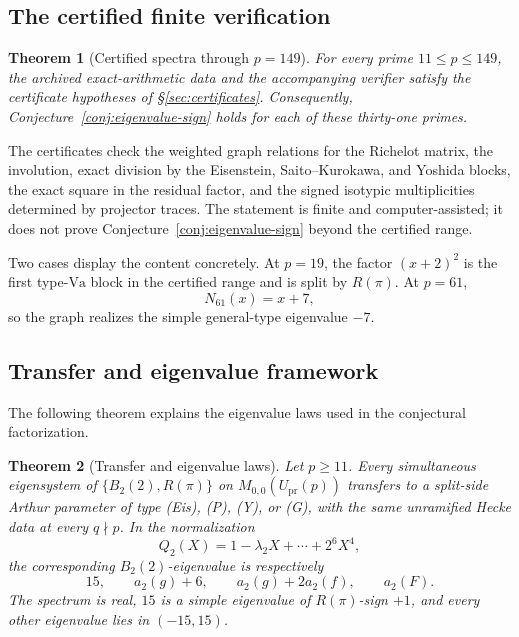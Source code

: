 \documentclass[10pt,a4paper]{amsart}
\newtheorem{theorem}{Theorem}[section]
\newcommand{\Upr}{U_{\mathrm{pr}}}
\newcommand{\Va}{\mathrm{Va}}
\providecommand{\Upr}{U_{\mathrm{pr}}}
\providecommand{\Va}{\mathrm{Va}}
\begin{document}
	\subsection{The certified finite verification}
	
	\begin{theorem}[Certified spectra through $p=149$]
		\label{thm:certified-spectra}
		For every prime $11\le p\le149$, the archived exact-arithmetic data and the
		accompanying verifier satisfy the certificate hypotheses of \S\ref{sec:certificates}.
		Consequently, Conjecture~\ref{conj:eigenvalue-sign} holds for each of these thirty-one
		primes.
	\end{theorem}
	
	The certificates check the weighted graph relations for the Richelot
	matrix, the involution, exact division by the Eisenstein,
	Saito--Kurokawa, and Yoshida blocks, the exact square in the residual
	factor, and the signed isotypic multiplicities determined by projector
	traces. The statement is finite and computer-assisted; it does not prove
	Conjecture~\ref{conj:eigenvalue-sign} beyond the certified range.
	
	Two cases display the content concretely. At $p=19$, the factor
	$(x+2)^2$ is the first type-$\Va$ block in the certified range and is
	split by $R(\pi)$. At $p=61$,
	\[
	N_{61}(x)=x+7,
	\]
	so the graph realizes the simple general-type eigenvalue $-7$.
	
	\subsection{Transfer and eigenvalue framework}
	
	The following theorem explains the eigenvalue laws used in the
	conjectural factorization.
	
	\begin{theorem}[Transfer and eigenvalue laws]\label{thm:transfer-framework}
		Let $p\ge11$. Every simultaneous eigensystem of $\{B_2(2),R(\pi)\}$ on
		$M_{0,0}(\Upr(p))$ transfers to a split-side Arthur parameter of type
		\textup{(Eis)}, \textup{(P)}, \textup{(Y)}, or \textup{(G)}, with the
		same unramified Hecke data at every $q\nmid p$. In the normalization
		\[
		Q_2(X)=1-\lambda_2X+\cdots+2^6X^4,
		\]
		the corresponding $B_2(2)$-eigenvalue is respectively
		\[
		15,\qquad a_2(g)+6,\qquad a_2(g)+2a_2(f),\qquad a_2(F).
		\]
		The spectrum is real, $15$ is a simple eigenvalue of $R(\pi)$-sign $+1$,
		and every other eigenvalue lies in $(-15,15)$.
	\end{theorem}
	
\end{document}
